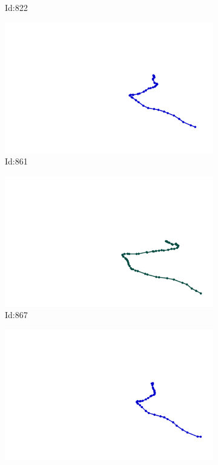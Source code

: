 \documentclass[12pt,twoside]{report}
\begin{document}
\begin{figure}
\begin{subfigure}[b]{0.20\textwidth}
\caption{Id:822}
\end{subfigure}
\begin{subfigure}[b]{0.20\textwidth}
\centering
\includegraphics[width=\textwidth]{../trajectories/861.png}
\caption{Id:861}
\end{subfigure}
\begin{subfigure}[b]{0.20\textwidth}
\centering
\includegraphics[width=\textwidth]{../trajectories/867.png}
\caption{Id:867}
\end{subfigure}
\begin{subfigure}[b]{0.20\textwidth}
\centering
\includegraphics[width=\textwidth]{../trajectories/868.png}

\end{subfigure}
\end{figure}
\end{document}
